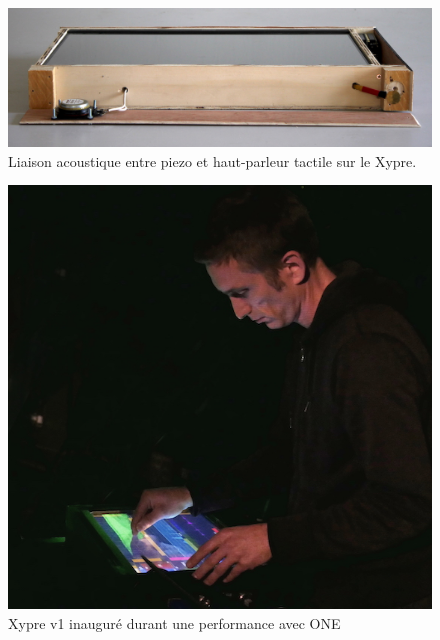 \begin{figure}[!htbp]
	\captionsetup{format=plain}%
	\includegraphics[width=\textwidth]{gfx/05_interfaces/Xypre_FrontPanel_144dpi.jpg}
	\caption[Liaison acoustique entre piezo et haut-parleur tactile sur le Xypre]{Liaison acoustique entre piezo et haut-parleur tactile sur le Xypre.}
	\label{fig:interface:xypre_v2-hppiezo}
\end{figure}


\begin{figure}[!htbp]
	\captionsetup{format=plain}%
	\includegraphics[width=\textwidth]{gfx/05_interfaces/xypre-v1_72dpi.jpg}
	\caption{Xypre v1 inauguré durant une performance avec ONE}
	\label{fig:interface:xyprev1_jeu}
\end{figure}


